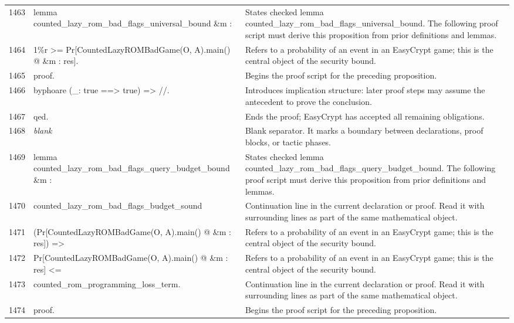 \documentclass[10pt]{article}
\begin{document}
\begin{longtable}{r L{0.53\textwidth} L{0.37\textwidth}}
1463 & {\ttfamily\scriptsize lemma counted\_lazy\_rom\_bad\_flags\_universal\_bound \&m :} & States checked lemma counted\_lazy\_rom\_bad\_flags\_universal\_bound.  The following proof script must derive this proposition from prior definitions and lemmas. \\
1464 & {\ttfamily\scriptsize   1\%r >= Pr[CountedLazyROMBadGame(O, A).main() @ \&m : res].} & Refers to a probability of an event in an EasyCrypt game; this is the central object of the security bound. \\
1465 & {\ttfamily\scriptsize proof.} & Begins the proof script for the preceding proposition. \\
1466 & {\ttfamily\scriptsize byphoare (\_: true ==> true) => //.} & Introduces implication structure: later proof steps may assume the antecedent to prove the conclusion. \\
1467 & {\ttfamily\scriptsize qed.} & Ends the proof; EasyCrypt has accepted all remaining obligations. \\
1468 & {\ttfamily\scriptsize \emph{blank}} & Blank separator.  It marks a boundary between declarations, proof blocks, or tactic phases. \\
1469 & {\ttfamily\scriptsize lemma counted\_lazy\_rom\_bad\_flags\_query\_budget\_bound \&m :} & States checked lemma counted\_lazy\_rom\_bad\_flags\_query\_budget\_bound.  The following proof script must derive this proposition from prior definitions and lemmas. \\
1470 & {\ttfamily\scriptsize   counted\_lazy\_rom\_bad\_flags\_budget\_sound} & Continuation line in the current declaration or proof.  Read it with surrounding lines as part of the same mathematical object. \\
1471 & {\ttfamily\scriptsize     (Pr[CountedLazyROMBadGame(O, A).main() @ \&m : res]) =>} & Refers to a probability of an event in an EasyCrypt game; this is the central object of the security bound. \\
1472 & {\ttfamily\scriptsize   Pr[CountedLazyROMBadGame(O, A).main() @ \&m : res] <=} & Refers to a probability of an event in an EasyCrypt game; this is the central object of the security bound. \\
1473 & {\ttfamily\scriptsize     counted\_rom\_programming\_loss\_term.} & Continuation line in the current declaration or proof.  Read it with surrounding lines as part of the same mathematical object. \\
1474 & {\ttfamily\scriptsize proof.} & Begins the proof script for the preceding proposition. \\

\end{longtable}
\end{document}
